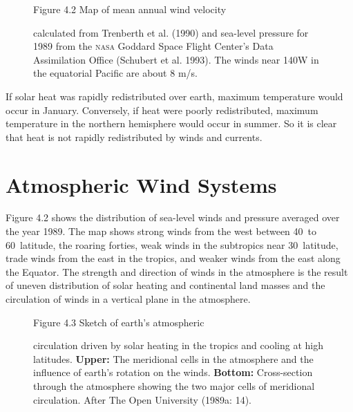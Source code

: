 \begin{figure}[b!]
\vspace{-2ex}
\footnotesize
Figure 4.2 Map of mean annual wind velocity \rule{0 pt}{3 ex}
calculated from Trenberth et al. (1990) and sea-level pressure for 1989 from the \textsc{nasa}
Goddard Space Flight Center's Data Assimilation Office (Schubert et al. 1993). The winds near
140\degrees W in the equatorial Pacific are about 8 m/s.
\label{fig:surfacewinds} %
\end{figure}

If solar heat was rapidly redistributed over earth, maximum
temperature would occur in January. Conversely, if heat were poorly redistributed,
maximum temperature in the northern hemisphere would occur in summer. So it is
clear that heat is not rapidly redistributed by winds and currents.

\section{Atmospheric Wind Systems}
Figure 4.2 shows the distribution of sea-level winds and pressure averaged
over the year 1989. The map shows strong winds from the west between 40\degrees\
to 60\degrees\ latitude, the roaring forties, weak winds in the subtropics near
30\degrees\ latitude, trade winds from the east in the tropics, and weaker winds
from the east along the Equator. The strength and direction of winds in the
atmosphere is the result of uneven distribution of solar heating and continental
land masses and the circulation of winds in a vertical plane in the atmosphere.

\begin{figure}[b!]
\vspace{-2ex}
\footnotesize
Figure 4.3 Sketch of earth's atmospheric \rule{0mm}{3ex}circulation
driven by solar heating in the tropics and cooling at high latitudes.
\textbf{Upper:} The meridional cells in the atmosphere and the influence of
earth's rotation on the winds. \textbf{Bottom:} Cross-section through the
atmosphere showing the two major cells of meridional circulation. After The Open
University (1989a: 14).
\label{fig:atmosphere}
\end{figure}

